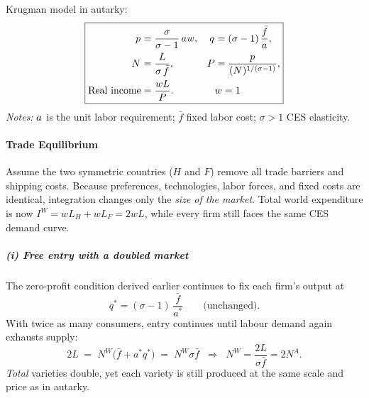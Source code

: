 \documentclass[11pt,letterpaper]{article}
\begin{document}
\begin{comment}
        
          \addplot[thick,red,  domain=0:2]
            {(\fbar) * x^(\sigma/(\sigma-1)) + 1};

          \addplot[thick,blue,  domain=0.6:3]
            {\sigma / (\sigma-1) / x^(1/(\sigma-1)) };
        \end{axis}
    
    \end{tikzpicture}
            \caption{Markup as a function of the elasticity of substitution}
        \label{fig: ces-markup}
    \end{figure}

\end{comment}

\begin{center}
Krugman model in autarky:
\[
\boxed{
\begin{aligned}
p^{\*} &= \frac{\sigma}{\sigma-1}\,a^{\*}w, &
q^{\*} &= (\sigma-1)\,\frac{\bar f}{a^{\*}}, \\
N^{\*} &= \frac{L}{\sigma\,\bar f}, &
P &= \frac{p^{\*}}{(N^{\*})^{1/(\sigma-1)}}, \\
\text{Real income} &= \dfrac{wL}{P}. && w=1
\end{aligned}
}
\]
\small\emph{Notes:} $a^{\*}$ is the unit labor requirement; $\bar f$ fixed labor cost; $\sigma>1$ CES elasticity.
\end{center}

\paragraph{Trade Equilibrium}

Assume the two symmetric countries ($H$ and $F$) remove all trade barriers
and shipping costs.  Because preferences, technologies, labor forces,
and fixed costs are identical, integration changes only the \emph{size of
the market}.  Total world expenditure is now $I^{W}=wL_{H}+wL_{F}=2wL$,
while every firm still faces the same CES demand curve.

\subparagraph{(i)  Free entry with a doubled market}

The zero-profit condition derived earlier continues to fix each firm’s
output at
\[
q^{\ast}=(\sigma-1)\,\frac{\bar f}{a^{\ast}}
\qquad\text{(unchanged).}
\]
With twice as many consumers, entry continues until labour demand again
exhausts supply:
\[
2L
   \;=\;
   N^{W}\bigl(\bar f + a^{\ast}q^{\ast}\bigr)
   \;=\;
   N^{W}\sigma\bar f
   \;\;\Longrightarrow\;\;
   N^{W}=\frac{2L}{\sigma\bar f}=2N^{A}.
\]
\emph{Total} varieties double, yet each variety is still produced at the
same scale and price as in autarky.
\end{document}
